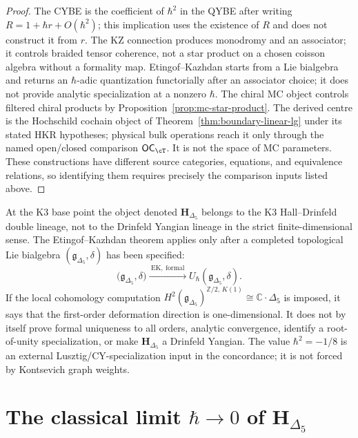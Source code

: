 \begin{proof}
The CYBE is the coefficient of \(\hbar^2\) in the QYBE after writing
\(R=1+\hbar r+O(\hbar^2)\); this implication uses the existence of
\(R\) and does not construct it from \(r\). The KZ connection produces
monodromy and an associator; it controls braided tensor coherence, not
a star product on a chosen coisson algebra without a formality map.
Etingof--Kazhdan starts from a Lie bialgebra and returns an
\(\hbar\)-adic quantization functorially after an associator choice; it
does not provide analytic specialization at a nonzero \(\hbar\).
The chiral MC object controls filtered chiral products by
Proposition~\ref{prop:mc-star-product}. The derived centre is the
Hochschild cochain object of Theorem~\ref{thm:boundary-linear-lg} under
its stated HKR hypotheses; physical bulk operations reach it only
through the named open/closed comparison \(\mathsf{OC}_{\cT}\). It is
not the space of MC parameters. These constructions have different
source categories, equations, and equivalence relations, so identifying
them requires precisely the comparison inputs listed above.
\end{proof}

\begin{remark}
\label{rem:defq-1}
At the K3 base point the object denoted
$\mathbf H_{\Delta_5}$ belongs to the K3 Hall--Drinfeld double
lineage, not to the Drinfeld Yangian lineage in the strict
finite-dimensional sense. The Etingof--Kazhdan theorem applies only
after a completed topological Lie bialgebra
$(\mathfrak g_{\Delta_5},\delta)$ has been specified:
\[
\bigl(\mathfrak g_{\Delta_5},\delta\bigr)
\xrightarrow{\;\mathrm{EK,\ formal}\;}
U_\hbar(\mathfrak g_{\Delta_5},\delta).
\]
If the local cohomology computation
$H^2(\mathfrak g_{\Delta_5})^{\mathbb Z/2,\,K(1)}
\cong \mathbb C\cdot\Delta_5$ is imposed, it says that the first-order
deformation direction is one-dimensional. It does not by itself prove
formal uniqueness to all orders, analytic convergence, identify a
root-of-unity specialization, or make $\mathbf H_{\Delta_5}$ a
Drinfeld Yangian. The value
$\hbar^2=-1/8$ is an external Lusztig/CY-specialization input in the
concordance; it is not forced by Kontsevich graph weights.
\end{remark}

\section{The classical limit $\hbar \to 0$ of $\mathbf H_{\Delta_5}$}
\label{sec:defq-kazhdan-classical}


